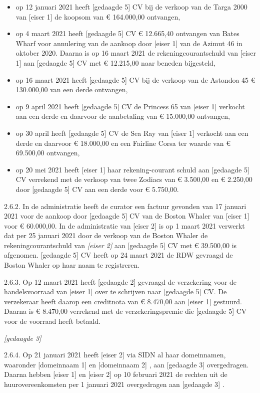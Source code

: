 \documentclass[
  dutch,
  a4paper,
]{article}
\begin{document}
\begin{itemize}
\item
  op 12 januari 2021 heeft {[}gedaagde 5{]} CV bij de verkoop van de Targa 2000 van {[}eiser 1{]} de koopsom van € 164.000,00 ontvangen,
\item
  op 4 maart 2021 heeft {[}gedaagde 5{]} CV € 12.665,40 ontvangen van Bates Wharf voor annulering van de aankoop door {[}eiser 1{]} van de Azimut 46 in oktober 2020. Daarna is op 16 maart 2021 de rekeningcourantschuld van {[}eiser 1{]} aan {[}gedaagde 5{]} CV met € 12.215,00 naar beneden bijgesteld,
\item
  op 16 maart 2021 heeft {[}gedaagde 5{]} CV bij de verkoop van de Astondoa 45 € 130.000,00 van een derde ontvangen,
\item
  op 9 april 2021 heeft {[}gedaagde 5{]} CV de Princess 65 van {[}eiser 1{]} verkocht aan een derde en daarvoor de aanbetaling van € 15.000,00 ontvangen,
\item
  op 30 april heeft {[}gedaagde 5{]} CV de Sea Ray van {[}eiser 1{]} verkocht aan een derde en daarvoor € 18.000,00 en een Fairline Corsa ter waarde van € 69.500,00 ontvangen,
\item
  op 20 mei 2021 heeft {[}eiser 1{]} haar rekening-courant schuld aan {[}gedaagde 5{]} CV verrekend met de verkoop van twee Zodiacs van € 3.500,00 en € 2.250,00 door {[}gedaagde 5{]} CV aan een derde voor € 5.750,00.
\end{itemize}

2.6.2. In de administratie heeft de curator een factuur gevonden van 17 januari 2021 voor de aankoop door {[}gedaagde 5{]} CV van de Boston Whaler van {[}eiser 1{]} voor € 60.000,00. In de administratie van {[}eiser 2{]} is op 1 maart 2021 verwerkt dat per 25 januari 2021 door de verkoop van de Boston Whaler de rekeningcourantschuld van \emph{{[}eiser 2{]}} aan {[}gedaagde 5{]} CV met € 39.500,00 is afgenomen. {[}gedaagde 5{]} CV heeft op 24 maart 2021 de RDW gevraagd de Boston Whaler op haar naam te registreren.

2.6.3. Op 12 maart 2021 heeft {[}gedaagde 2{]} gevraagd de verzekering voor de handelsvoorraad van {[}eiser 1{]} over te schrijven naar {[}gedaagde 5{]} CV. De verzekeraar heeft daarop een creditnota van € 8.470,00 aan {[}eiser 1{]} gestuurd. Daarna is € 8.470,00 verrekend met de verzekeringspremie die {[}gedaagde 5{]} CV voor de voorraad heeft betaald.

\emph{{[}gedaagde 3{]}}

2.6.4. Op 21 januari 2021 heeft {[}eiser 2{]} via SIDN al haar domeinnamen, waaronder {[}domeinnaam 1{]} en {[}domeinnaam 2{]} , aan {[}gedaagde 3{]} overgedragen. Daarna hebben {[}eiser 1{]} en {[}eiser 2{]} op 10 februari 2021 de rechten uit de huurovereenkomsten per 1 januari 2021 overgedragen aan {[}gedaagde 3{]} .
\end{document}
